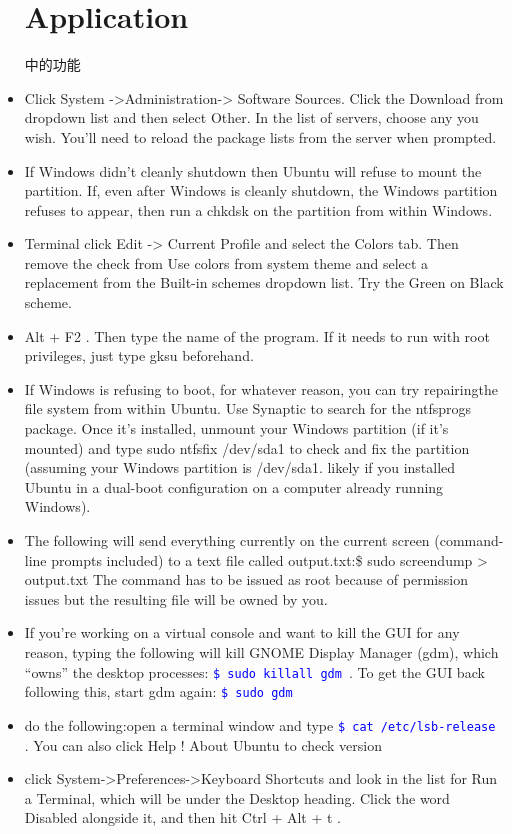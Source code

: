 \documentclass[a4paper,12pt,twoside]{book}
\newcommand{\linuxcommand}[1]{\texttt{\textcolor{blue}{\$ #1 \Pisymbol{psy}{191}}}}
\begin{document}
\begin{CJK*}{UTF8}{song}
\begin{itemize}
\chapter{Application}中的功能\item Click System ->Administration-> Software Sources. Click the Download from dropdown list and then select Other. In the list of servers, choose any you wish. You'll need to reload the package lists from the server when prompted.
		\item If Windows didn't cleanly shutdown then Ubuntu will refuse to mount the partition. If, even after Windows is cleanly shutdown, the Windows partition refuses to appear, then run a chkdsk on the partition from within Windows.
		\item Terminal click Edit -> Current Profile and select the Colors tab. Then remove the check from Use colors from system theme and select a replacement from the Built-in schemes dropdown list. Try the Green on Black scheme.
		\item Alt + F2 . Then type the name of the program. If it needs to run with root privileges, just type gksu beforehand.
		\item If Windows is refusing to boot, for whatever reason, you can try repairingthe file system from within Ubuntu. Use Synaptic to search for the ntfsprogs package. Once it's installed, unmount your Windows partition (if it's mounted) and
		type sudo ntfsfix /dev/sda1 to check and fix the partition (assuming your Windows partition is /dev/sda1. likely if you installed Ubuntu in a dual-boot configuration on a computer already running Windows).
		\item The following will send everything currently on the current screen (command-line prompts included) to a text file called output.txt:\$ sudo screendump > output.txt
		The command has to be issued as root because of permission issues but the resulting file will be owned by you.
		\item 	If you're working on a virtual console and want to kill the GUI for any reason, typing the following will kill GNOME Display Manager (gdm), which ``owns'' the desktop processes:
		\linuxcommand{sudo killall gdm}. To get the GUI back following this, start gdm again: \linuxcommand{sudo gdm}
		\item do the following:open a terminal window and type \linuxcommand{cat /etc/lsb-release}. You can also click Help ! About Ubuntu to check version
		\item click System->Preferences->Keyboard Shortcuts and look in the list for Run a Terminal, which will be under the Desktop heading. Click the word Disabled alongside it, and then hit Ctrl + Alt + t .

\end{itemize}
\end{CJK*}
\end{document}
